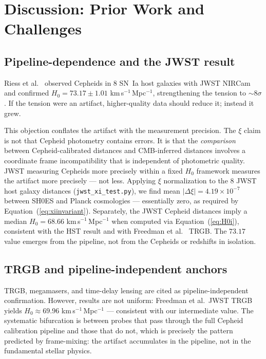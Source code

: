 \documentclass[usenatbib]{mnras}
\begin{document}
\section{Discussion: Prior Work and Challenges}
\label{sec:objections}

\subsection{Pipeline-dependence and the JWST result}

Riess et al.\ \citeyear{riess2023jwst} observed Cepheids in 8 SN~Ia host
galaxies with JWST NIRCam and confirmed $H_0 = 73.17 \pm 1.01$
km\,s$^{-1}$\,Mpc$^{-1}$, strengthening the tension to $\sim8\sigma$. If
the tension were an artifact, higher-quality data should reduce it; instead
it grew.

This objection conflates the artifact with the measurement precision. The
$\xi$ claim is not that Cepheid photometry contains errors. It is that the
\emph{comparison} between Cepheid-calibrated distances and CMB-inferred
distances involves a coordinate frame incompatibility that is independent of
photometric quality. JWST measuring Cepheids more precisely within a fixed
$H_0$ framework measures the artifact more precisely --- not less. Applying
$\xi$ normalization to the 8 JWST host galaxy distances
(\texttt{jwst\_xi\_test.py}), we find mean $|\Delta\xi| = 4.19 \times 10^{-7}$
between SH0ES and Planck cosmologies --- essentially zero, as required by
Equation~(\ref{eq:xiinvariant}). Separately, the JWST Cepheid distances imply
a median $H_0 = 68.66$ km\,s$^{-1}$\,Mpc$^{-1}$ when computed via
Equation~(\ref{eq:H0i}), consistent with the HST result and with Freedman
et al.\ \citeyear{freedman2024} TRGB. The $73.17$ value emerges from the
pipeline, not from the Cepheids or redshifts in isolation.

\subsection{TRGB and pipeline-independent anchors}

TRGB, megamasers, and time-delay lensing are cited as pipeline-independent
confirmation. However, results are not uniform: Freedman et al.\ JWST TRGB
yields $H_0 \approx 69.96$ km\,s$^{-1}$\,Mpc$^{-1}$
\citep{freedman2024} --- consistent with our intermediate value.
The systematic bifurcation is between probes that pass through the full
Cepheid calibration pipeline and those that do not, which is precisely the
pattern predicted by frame-mixing: the artifact accumulates in the pipeline,
not in the fundamental stellar physics.
\end{document}
